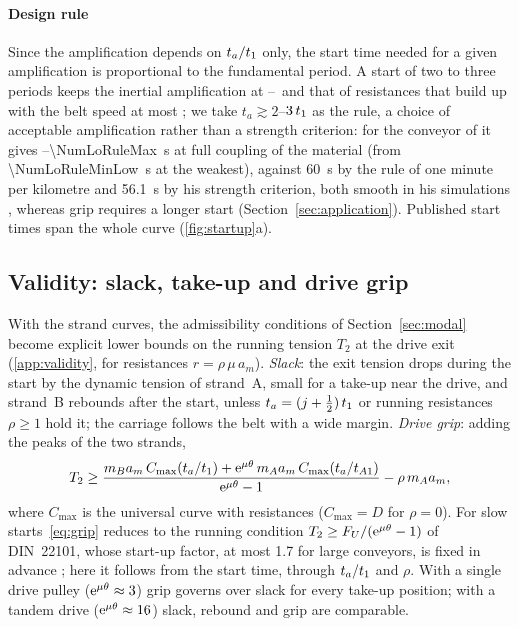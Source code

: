 \paragraph{Design rule} Since the amplification depends on $t_a/t_{1}$ only, the start time
needed for a given amplification is proportional to the fundamental period. A start of two to
three periods keeps the inertial amplification at \NumStartDThree--\NumStartDTwo\ and that of
resistances that build up with the belt speed at most \NumStartResTwo; we take
$t_a\gtrsim2$--$3\,t_{1}$ as the rule, a choice of acceptable amplification rather than a
strength criterion: for the conveyor of
\citet{lodewijks1996} it gives \NumLoRuleMin--\qty{\NumLoRuleMax}{\second} at full coupling of the material (from
\qty{\NumLoRuleMinLow}{\second} at the weakest), against
\qty{60}{\second} by the rule of one minute per kilometre and \qty{56.1}{\second} by his strength
criterion, both smooth in his simulations \citep[Table~8.8]{lodewijks1996}, whereas grip
requires a longer start (Section~\ref{sec:application}). Published start times span the whole
curve (\cref{fig:startup}a).

\subsection{Validity: slack, take-up and drive grip}\label{sec:validity}

With the strand curves, the admissibility conditions of Section~\ref{sec:modal} become explicit
lower bounds on the running tension $T_2$ at the drive exit (\cref{app:validity}, for
resistances $r=\rho\,\mu\,a_m$). \emph{Slack}: the exit tension drops during the start by the
dynamic tension of strand~A, small for a take-up near the drive, and strand~B rebounds after the
start, unless $t_a=(j+\tfrac12)\,t_{1}$ or running resistances $\rho\ge1$ hold it; the carriage
follows the belt with a wide margin. \emph{Drive grip}: adding the peaks of the two strands,
\begin{equation}\label{eq:grip}
  T_2\ge\frac{m_Ba_m\,C_\mathrm{max}(t_a/t_{1})+\mathrm{e}^{\mu\theta}\,m_Aa_m\,C_\mathrm{max}(t_a/t_{A1})}
  {\mathrm{e}^{\mu\theta}-1}-\rho\,m_Aa_m ,
\end{equation}
where $C_\mathrm{max}$ is the universal curve with resistances ($C_\mathrm{max}=D$ for $\rho=0$).
For slow starts~\eqref{eq:grip} reduces to the running condition $T_2\ge F_U/(\mathrm{e}^{\mu\theta}-1)$ of
DIN~22101, whose start-up factor, at most 1.7 for large conveyors, is fixed in advance
\citep[\S7.3.1]{din22101}; here it follows from the start time, through $t_a/t_{1}$ and $\rho$. With a single drive pulley
($\mathrm{e}^{\mu\theta}\approx3$) grip governs over slack for every take-up position; with a tandem drive
($\mathrm{e}^{\mu\theta}\approx16$) slack, rebound and grip are comparable.

